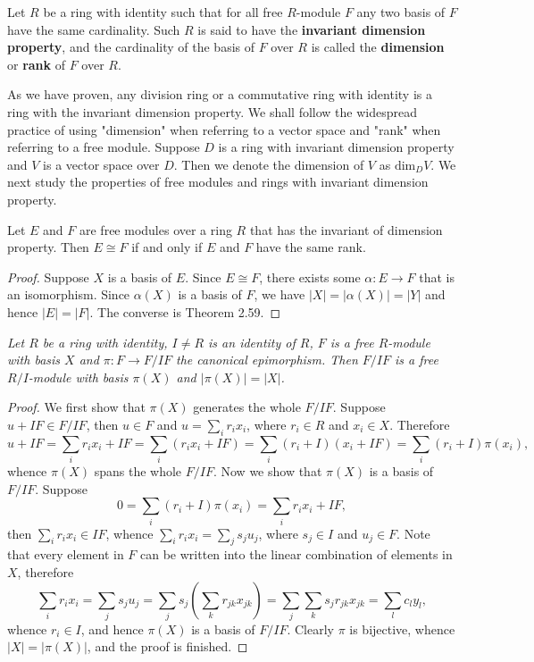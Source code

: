 \begin{definition}
Let $R$ be a ring with identity such that for all free $R$-module $F$ any two basis of $F$ have the same cardinality. Such $R$ is said to have the \textbf{invariant dimension property}, and the cardinality of the basis of $F$ over $R$ is called the \textbf{dimension} or \textbf{rank} of $F$ over $R$.
\end{definition}
As we have proven, any division ring or a commutative ring with identity is a ring with the invariant dimension property. We shall follow the widespread practice of using "dimension" when referring to a vector space and "rank" when referring to a free module. Suppose $D$ is a ring with invariant dimension property and $V$ is a vector space over $D$. Then we denote the dimension of $V$ as $\mathrm{dim}_DV$. We next study the properties of free modules and rings with invariant dimension property.\par
\begin{proposition}
Let $E$ and $F$ are free modules over a ring $R$ that has the invariant of dimension property. Then $E\cong F$ if and only if $E$ and $F$ have the same rank.
\end{proposition}
\begin{proof}
Suppose $X$ is a basis of $E$. Since $E\cong F$, there exists some $\alpha:E\to F$ that is an isomorphism. Since $\alpha(X)$ is a basis of $F$, we have $|X|=|\alpha(X)|=|Y|$ and hence $|E|=|F|$. The converse is Theorem 2.59.
\end{proof}
\begin{lemma}\em
Let $R$ be a ring with identity, $I\ne R$ is an identity of $R$, $F$ is a free $R$-module with basis $X$ and $\pi:F\to F/IF$ the canonical epimorphism. Then $F/IF$ is a free $R/I$-module with basis $\pi(X)$ and $|\pi(X)|=|X|$.
\end{lemma}
\begin{proof}
We first show that $\pi(X)$ generates the whole $F/IF$. Suppose $u+IF\in F/IF$, then $u\in F$ and $u=\sum_ir_ix_i$, where $r_i\in R$ and $x_i\in X$. Therefore 
$$
u+IF=\sum_i{r_ix_i}+IF=\sum_i{\left( r_ix_i+IF \right)}=\sum_i{\left( r_i+I \right) \left( x_i+IF \right)}=\sum_i{\left( r_i+I \right) \pi \left( x_i \right)},
$$
whence $\pi(X)$ spans the whole $F/IF$. Now we show that $\pi(X)$ is a basis of $F/IF$. Suppose 
$$
0=\sum_i{\left( r_i+I \right) \pi \left( x_i \right)}=\sum_i{r_ix_i}+IF,
$$
then $\sum_ir_ix_i\in IF$, whence $\sum_ir_ix_i=\sum_js_ju_j$, where $s_j\in I$ and $u_j\in F$. Note that every element in $F$ can be written into the linear combination of elements in $X$, therefore 
$$
\sum_i{r_ix_i}=\sum_j{s_ju_j}=\sum_j{s_j\left( \sum_k{r_{jk}x_{jk}} \right)}=\sum_j{\sum_k{s_jr_{jk}x_{jk}}}=\sum_l{c_ly_l},
$$
whence $r_i\in I$, and hence $\pi(X)$ is a basis of $F/IF$. Clearly $\pi$ is bijective, whence $|X|=|\pi(X)|$, and the proof is finished.
\end{proof}
